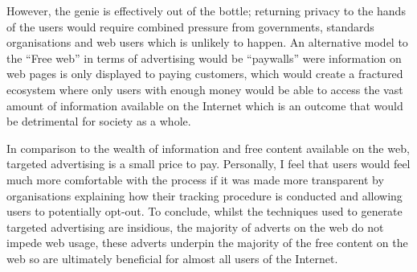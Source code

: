 \documentclass{article}
\begin{document}
However, the genie is effectively out of the bottle; returning privacy to the hands of the users would require combined pressure from governments, standards organisations and web users which is unlikely to happen. An alternative model to the ``Free web'' in terms of advertising would be ``paywalls'' were information on web pages is only displayed to paying customers, which would create a fractured ecosystem where only users with enough money would be able to access the vast amount of information available on the Internet which is an outcome that would be detrimental for society as a whole. 

In comparison to the wealth of information and free content available on the web, targeted advertising is a small price to pay. Personally, I feel that users would feel much more comfortable with the process if it was made more transparent by organisations explaining how their tracking procedure is conducted and allowing users to potentially opt-out. To conclude, whilst the techniques used to generate targeted advertising are insidious, the majority of adverts on the web do not impede web usage, these adverts underpin the majority of the free content on the web so are ultimately beneficial for almost all users of the Internet.

\medskip
\printbibliography
\end{document}
